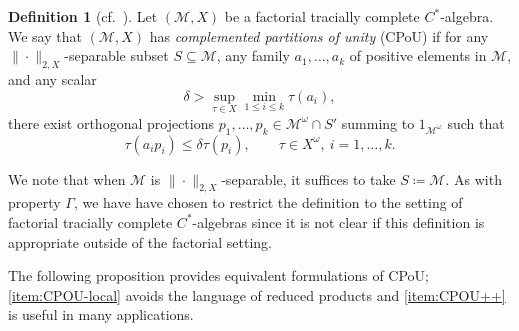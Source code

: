 \documentclass[a4paper,11pt]{amsart}
\theoremstyle{definition}
\newtheorem{definition}[theorem]{Definition}
\numberwithin{equation}{section}
\numberwithin{theorem}{section}
\newcommand{\M}{\mathcal{M}}
\begin{document}
\begin{definition}[{cf.\ \cite[Definition~3.1]{CETWW}}]\label{dfn:utcCPOU}
	Let $(\M,X)$ be a factorial tracially complete $C^*$-algebra. We say that $(\M,X)$ has \emph{complemented partitions of unity} (CPoU) if for any $\|\cdot\|_{2,X}$-separable subset $S \subseteq \M$, any family $a_1,\dots,a_k$ of positive elements in $\M$, and any scalar
	\begin{equation}\label{eq:CPoUTraceIneq1}
		\delta>\sup_{\tau \in X} \min_{1 \leq i \leq k}\tau(a_i),
	\end{equation}
	there exist orthogonal projections $p_1,\dots,p_k\in \M^\omega\cap S'$ summing to $1_{\M^\omega}$ such that
	\begin{equation}\label{eq:CPoUTraceIneq2}
		\tau(a_ip_i)\leq \delta\tau(p_i),\qquad \tau\in X^\omega,\ i=1,\dots,k.
	\end{equation}
\end{definition}

We note that when $\M$ is $\|\cdot\|_{2,X}$-separable, it suffices to take $S \coloneqq \M$. 
As with property $\Gamma$, we have have chosen to restrict the definition to the setting of factorial tracially complete $C^*$-algebras since it is not clear if this definition is appropriate outside of the factorial setting.

The following proposition provides equivalent formulations of CPoU; \ref{item:CPOU-local} avoids the language of reduced products and \ref{item:CPOU++} is useful in many applications. 
\end{document}
